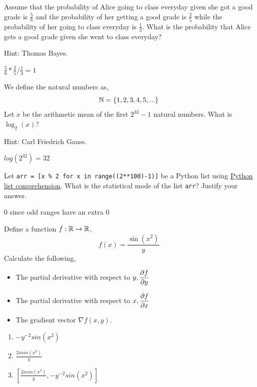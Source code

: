 \documentclass{homework}
\newcommand\listcomp{\href{%
    https://www.w3schools.com/python/python_lists_comprehension.asp%
  }{Python list comprehension}}
\begin{document}
\question Assume that the probability of Alice going to class everyday given
she got a good grade is $\frac{5}{6}$ and the probability of her
getting a good grade is $\frac{2}{5}$ while the probability of her
going to class everyday is $\frac{1}{3}$. What is the probability
that Alice gets a good grade given she went to class everyday?

Hint: Thomas Bayes.

\begin{sol}
  $\frac{5}{6} * \frac{2}{5} / \frac{1}{3} = 1$
\end{sol}

\question We define the natural numbers as,
\[
  \mathbb{N} = \{1, 2, 3, 4, 5, ...\}
\]
Let $x$ be the arithmetic mean of the first $2^{33}-1$ natural
numbers. What is $\log_2(x)$?

Hint: Carl Friedrich Gauss.

\begin{sol}
  $log(2^{32})=32$ 
\end{sol}

\question Let \texttt{arr = [x \% 2 for x in range((2**100)-1)]} be a
Python list using \listcomp{}. What is the statistical mode of the
list \texttt{arr}? Justify your answer.

\begin{sol}
  0 since odd ranges have an extra 0 
\end{sol}

\question Define a function $f:\mathbb{R}\rightarrow\mathbb{R}$,
\[
  f(x) = \frac{\sin(x^2)}{y}
\]
Calculate the following,
\begin{itemize}
  \item The partial derivative with respect to $y, \displaystyle\frac{\partial
            f}{\partial y}$
  \item The partial derivative with respect to $x, \displaystyle\frac{\partial
            f}{\partial x}$
  \item The gradient vector $\nabla f(x, y)$.
\end{itemize}

\begin{sol}
\begin{enumerate}
  \item $-y^{-2}sin(x^2)$
  \item $\frac{2xcos(x^2)}{y}$
  \item $[\frac{2xcos(x^2)}{y}, -y^{-2}sin(x^2)]$
\end{enumerate}
\end{sol}
\end{document}
